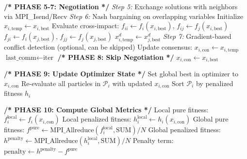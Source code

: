 \documentclass[11pt,a4paper]{article}
\begin{document}
\begin{algorithm}
\begin{algorithmic}[1]
        \State \textbf{/* PHASE 5-7: Negotiation */}
        \State \textit{Step 5:} Exchange solutions with neighbors via MPI\_Isend/Recv
        \State \textit{Step 6:} Nash bargaining on overlapping variables
        \State \quad Initialize $x_{i,\text{temp}} \gets x_{i,\text{best}}$
            \State Evaluate cross-impact: $f_{ii} \gets f_i(x_{i,\text{best}})$, $f_{ij} \gets f_j(x_{i,\text{best}})$
            \State \quad\quad\quad\quad\quad\quad\quad $f_{ji} \gets f_i(x_{j,\text{best}})$, $f_{jj} \gets f_j(x_{j,\text{best}})$
                \State $x_{i,\text{temp}}^d \gets x_{j,\text{best}}^d$ 
            \EndIf
        \EndFor
        \State \textit{Step 7:} Gradient-based conflict detection (optional, can be skipped)
        \State Update consensus: $x_{i,\text{con}} \gets x_{i,\text{temp}}$
        \State $\text{last\_comm} \gets \text{iter}$
    \Else
        \State \textbf{/* PHASE 8: Skip Negotiation */}
        \State $x_{i,\text{con}} \gets x_{i,\text{best}}$ 
    \EndIf
    
    \State \textbf{/* PHASE 9: Update Optimizer State */}
    \State Set global best in optimizer to $x_{i,\text{con}}$
    \State Re-evaluate all particles in $\mathcal{P}_i$ with updated $x_{i,\text{con}}$
    \State Sort $\mathcal{P}_i$ by penalized fitness $h_i$
    
    \State \textbf{/* PHASE 10: Compute Global Metrics */}
    \State Local pure fitness: $f_i^{\text{local}} \gets f_i(x_{i,\text{con}})$
    \State Local penalized fitness: $h_i^{\text{local}} \gets h_i(x_{i,\text{con}})$
    \State Global pure fitness: $f^{\text{pure}} \gets \text{MPI\_Allreduce}(f_i^{\text{local}}, \text{SUM}) / N$
    \State Global penalized fitness: $h^{\text{penalty}} \gets \text{MPI\_Allreduce}(h_i^{\text{local}}, \text{SUM}) / N$
    \State Penalty term: $\text{penalty} \gets h^{\text{penalty}} - f^{\text{pure}}$
    

\end{algorithmic}
\end{algorithm}
\end{document}
